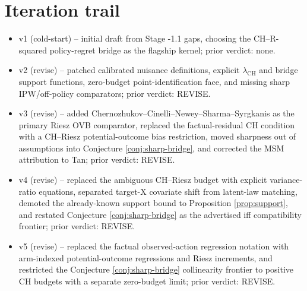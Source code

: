 \documentclass[11pt]{article}
\theoremstyle{definition}
\theoremstyle{plain}
\theoremstyle{remark}
\begin{document}
\section{Iteration trail}
\begin{itemize}[leftmargin=*]
\item v1 (cold-start) -- initial draft from Stage -1.1 gaps, choosing the CH--R-squared policy-regret bridge as the flagship kernel; prior verdict: none.
\item v2 (revise) -- patched calibrated nuisance definitions, explicit $\lambda_{\mathrm{CH}}$ and bridge support functions, zero-budget point-identification face, and missing sharp IPW/off-policy comparators; prior verdict: REVISE.
\item v3 (revise) -- added Chernozhukov--Cinelli--Newey--Sharma--Syrgkanis as the primary Riesz OVB comparator, replaced the factual-residual CH condition with a CH--Riesz potential-outcome bias restriction, moved sharpness out of assumptions into Conjecture \ref{conj:sharp-bridge}, and corrected the MSM attribution to Tan; prior verdict: REVISE.
\item v4 (revise) -- replaced the ambiguous CH--Riesz budget with explicit variance-ratio equations, separated target-X covariate shift from latent-law matching, demoted the already-known support bound to Proposition \ref{prop:support}, and restated Conjecture \ref{conj:sharp-bridge} as the advertised iff compatibility frontier; prior verdict: REVISE.
\item v5 (revise) -- replaced the factual observed-action regression notation with arm-indexed potential-outcome regressions and Riesz increments, and restricted the Conjecture \ref{conj:sharp-bridge} collinearity frontier to positive CH budgets with a separate zero-budget limit; prior verdict: REVISE.
\end{itemize}
\end{document}
